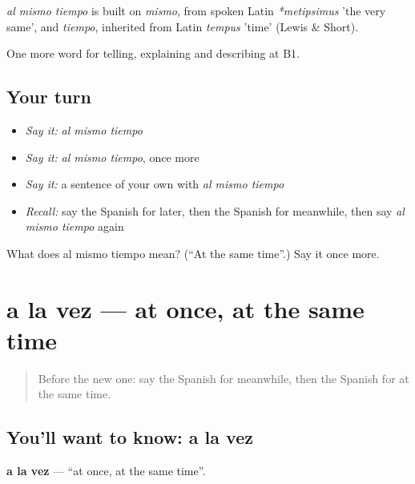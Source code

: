 \begin{cousinweb}
\emph{al mismo tiempo} is built on \emph{mismo}, from spoken Latin \emph{*metipsimus} 'the very same', and \emph{tiempo}, inherited from Latin \emph{tempus} 'time' (Lewis \& Short).
\end{cousinweb}

\begin{grammarlens}[title={What you've built}]
One more word for telling, explaining and describing at B1.
\end{grammarlens}

\subsection*{Your turn}
\begin{itemize}
\raggedright
  \item \emph{Say it:} \emph{al mismo tiempo}
  \item \emph{Say it:} \emph{al mismo tiempo}, once more
  \item \emph{Say it:} a sentence of your own with \emph{al mismo tiempo}
  \item \emph{Recall:} say the Spanish for later, then the Spanish for meanwhile, then say \emph{al mismo tiempo} again
\end{itemize}

\begin{tcolorbox}[breakable,colback=teal!4,colframe=teal!35!black,title={Before you move on}]
What does al mismo tiempo mean? (\textquotedblleft{}At the same time\textquotedblright{}.) Say it once more.
\end{tcolorbox}
\section[a la vez]{a la vez — at once, at the same time}

\label{lesson:ES-C536-a-la-vez}



\begin{quote}
Before the new one: say the Spanish for meanwhile, then the Spanish for at the same time.
\end{quote}

\subsection*{You'll want to know: a la vez}
\textbf{a la vez} — \textquotedblleft{}at once, at the same time\textquotedblright{}.

